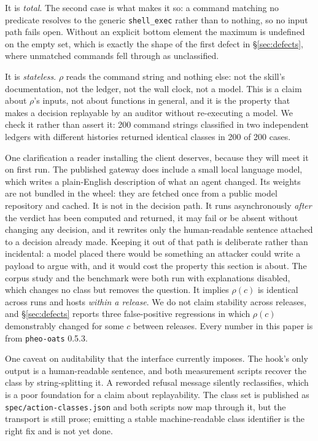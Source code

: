 \documentclass[10pt]{article}
\begin{document}
It is \emph{total}. The second case is what makes it so: a command matching no
predicate resolves to the generic \texttt{shell\_exec} rather than to nothing, so no
input path fails open. Without an explicit bottom element the maximum is undefined on
the empty set, which is exactly the shape of the first defect in
\S\ref{sec:defects}, where unmatched commands fell through as unclassified.

It is \emph{stateless}. $\rho$ reads the command string and nothing else: not the
skill's documentation, not the ledger, not the wall clock, not a model. This is a
claim about $\rho$'s inputs, not about functions in general, and it is the property
that makes a decision replayable by an auditor without re-executing a model. We check
it rather than assert it: 200 command strings classified in two independent ledgers
with different histories returned identical classes in 200 of 200 cases.

One clarification a reader installing the client deserves, because they will meet it
on first run. The published gateway does include a small local language model, which
writes a plain-English description of what an agent changed. Its weights are not
bundled in the wheel: they are fetched once from a public model repository and cached.
It is not in the decision path. It runs asynchronously \emph{after} the verdict has
been computed and returned, it may fail or be absent without changing any decision,
and it rewrites only the human-readable sentence attached to a decision already made.
Keeping it out of that path is deliberate rather than incidental: a model placed there
would be something an attacker could write a payload to argue with, and it would cost
the property this section is about. The corpus study and the benchmark were both run
with explanations disabled, which changes no class but removes the question. It implies
$\rho(c)$ is identical across runs and hosts \emph{within a release}. We do not claim
stability across releases, and \S\ref{sec:defects} reports three false-positive
regressions in which $\rho(c)$ demonstrably changed for some $c$ between releases.
Every number in this paper is from \texttt{pheo-oats} 0.5.3.

One caveat on auditability that the interface currently imposes. The hook's only
output is a human-readable sentence, and both measurement scripts recover the class
by string-splitting it. A reworded refusal message silently reclassifies, which is a
poor foundation for a claim about replayability. The class set is published as
\texttt{spec/action-classes.json} and both scripts now map through it, but the
transport is still prose; emitting a stable machine-readable class identifier is the
right fix and is not yet done.
\end{document}

